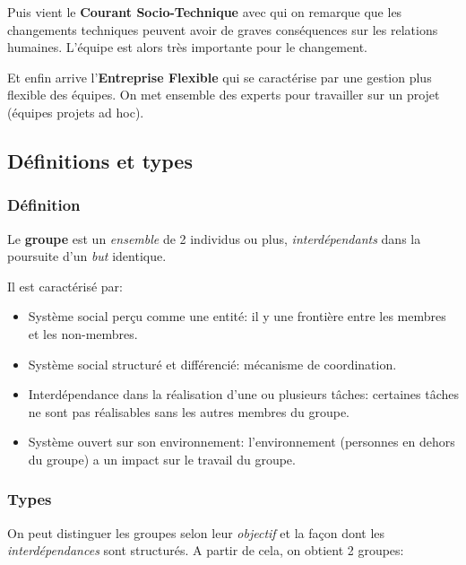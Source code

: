 \documentclass[12pt]{article}
\begin{document}
	Puis vient le \textbf{Courant Socio-Technique} avec qui on remarque que les changements techniques peuvent avoir de graves conséquences sur les relations humaines. L'équipe est alors très importante pour le changement.\newline
	
	Et enfin arrive l'\textbf{Entreprise Flexible} qui se caractérise par une gestion plus flexible des équipes. On met ensemble des experts pour travailler sur un projet (équipes projets ad hoc).
	
	\subsection{Définitions et types}
		\subsubsection{Définition}
		
		Le \textbf{groupe} est un \textit{ensemble} de 2 individus ou plus, \textit{interdépendants} dans la poursuite d'un \textit{but} identique. \newline
		
		Il est caractérisé par:
		\begin{itemize}
		\item Système social perçu comme une entité: il y une frontière entre les membres et les non-membres.
		\item Système social structuré et différencié: mécanisme de coordination.
		\item Interdépendance dans la réalisation d'une ou plusieurs tâches: certaines tâches ne sont pas réalisables sans les autres membres du groupe.
		\item Système ouvert sur son environnement: l'environnement (personnes en dehors du groupe) a un impact sur le travail du groupe.
		\end{itemize}
		
		\subsubsection{Types}
		
		On peut distinguer les groupes selon leur \textit{objectif} et la façon dont les \textit{interdépendances} sont structurés.	A partir de cela, on obtient 2 groupes: \newline
		
\end{document}

